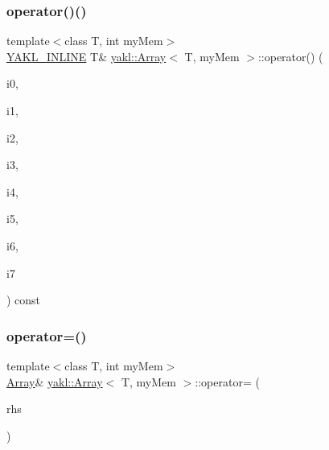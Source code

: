 \mbox{\label{classyakl_1_1Array_a7f7d1b0078839867894633a816f6d836}} 
\subsubsection{\texorpdfstring{operator()()}{operator()()}\hspace{0.1cm}{\footnotesize\ttfamily [8/8]}}
{\footnotesize\ttfamily template$<$class T, int my\+Mem$>$ \\
\hyperlink{YAKL_8h_aa0dd629ffce6d564b19e9313fb91a5ad}{Y\+A\+K\+L\+\_\+\+I\+N\+L\+I\+NE} T\& \hyperlink{classyakl_1_1Array}{yakl\+::\+Array}$<$ T, my\+Mem $>$\+::operator() (\begin{DoxyParamCaption}\item[{size\+\_\+t const}]{i0,  }\item[{size\+\_\+t const}]{i1,  }\item[{size\+\_\+t const}]{i2,  }\item[{size\+\_\+t const}]{i3,  }\item[{size\+\_\+t const}]{i4,  }\item[{size\+\_\+t const}]{i5,  }\item[{size\+\_\+t const}]{i6,  }\item[{size\+\_\+t const}]{i7 }\end{DoxyParamCaption}) const\hspace{0.3cm}{\ttfamily [inline]}}

\mbox{\label{classyakl_1_1Array_a6691a891ce2de823d6b4d982e826802a}} 
\subsubsection{\texorpdfstring{operator=()}{operator=()}\hspace{0.1cm}{\footnotesize\ttfamily [1/2]}}
{\footnotesize\ttfamily template$<$class T, int my\+Mem$>$ \\
\hyperlink{classyakl_1_1Array}{Array}\& \hyperlink{classyakl_1_1Array}{yakl\+::\+Array}$<$ T, my\+Mem $>$\+::operator= (\begin{DoxyParamCaption}\item[{\hyperlink{classyakl_1_1Array}{Array}$<$ T, my\+Mem $>$ const \&}]{rhs }\end{DoxyParamCaption})\hspace{0.3cm}{\ttfamily [inline]}}

